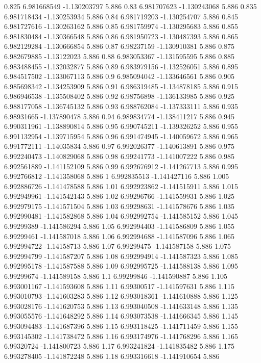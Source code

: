 {0.825 6.981668549 -1.130203797 5.886
0.83 6.981707623 -1.130243068 5.886
0.835 6.981718434 -1.130253934 5.886
0.84 6.981719203 -1.130254707 5.886
0.845 6.981727616 -1.130263162 5.886
0.85 6.981759974 -1.130295683 5.886
0.855 6.981830484 -1.130366548 5.886
0.86 6.981950723 -1.130487393 5.886
0.865 6.982129284 -1.130666854 5.886
0.87 6.98237159 -1.130910381 5.886
0.875 6.982679885 -1.13122023 5.886
0.88 6.983053367 -1.131595595 5.886
0.885 6.983488455 -1.132032877 5.886
0.89 6.983979156 -1.132526051 5.886
0.895 6.984517502 -1.133067113 5.886
0.9 6.985094042 -1.133646561 5.886
0.905 6.985698342 -1.134253909 5.886
0.91 6.986319485 -1.134878185 5.886
0.915 6.986946538 -1.135508402 5.886
0.92 6.98756898 -1.136133985 5.886
0.925 6.988177058 -1.136745132 5.886
0.93 6.988762084 -1.137333111 5.886
0.935 6.98931665 -1.137890478 5.886
0.94 6.989834774 -1.138411217 5.886
0.945 6.990311961 -1.138890814 5.886
0.95 6.990745211 -1.139326252 5.886
0.955 6.991132954 -1.139715954 5.886
0.96 6.991474945 -1.140059672 5.886
0.965 6.991772111 -1.14035834 5.886
0.97 6.992026377 -1.140613891 5.886
0.975 6.992240473 -1.140829068 5.886
0.98 6.99241773 -1.141007222 5.886
0.985 6.992561889 -1.141152109 5.886
0.99 6.992676912 -1.141267713 5.886
0.995 6.992766812 -1.141358068 5.886
1 6.992835513 -1.141427116 5.886
1.005 6.992886726 -1.141478588 5.886
1.01 6.992923862 -1.141515911 5.886
1.015 6.992949961 -1.141542143 5.886
1.02 6.99296766 -1.141559931 5.886
1.025 6.992979175 -1.141571504 5.886
1.03 6.99298631 -1.141578676 5.886
1.035 6.992990481 -1.141582868 5.886
1.04 6.992992754 -1.141585152 5.886
1.045 6.99299389 -1.141586294 5.886
1.05 6.992994403 -1.141586809 5.886
1.055 6.99299461 -1.141587018 5.886
1.06 6.992994688 -1.141587096 5.886
1.065 6.992994722 -1.14158713 5.886
1.07 6.99299475 -1.141587158 5.886
1.075 6.992994799 -1.141587207 5.886
1.08 6.992994914 -1.141587323 5.886
1.085 6.992995178 -1.141587588 5.886
1.09 6.992995725 -1.141588138 5.886
1.095 6.99299674 -1.141589158 5.886
1.1 6.99299846 -1.141590887 5.886
1.105 6.993001167 -1.141593608 5.886
1.11 6.99300517 -1.141597631 5.886
1.115 6.993010793 -1.141603283 5.886
1.12 6.993018361 -1.141610888 5.886
1.125 6.993028176 -1.141620753 5.886
1.13 6.993040508 -1.141633148 5.886
1.135 6.993055576 -1.141648292 5.886
1.14 6.993073538 -1.141666345 5.886
1.145 6.993094483 -1.141687396 5.886
1.15 6.993118425 -1.141711459 5.886
1.155 6.993145302 -1.141738472 5.886
1.16 6.993174976 -1.141768296 5.886
1.165 6.99320724 -1.141800723 5.886
1.17 6.993241824 -1.141835482 5.886
1.175 6.993278405 -1.141872248 5.886
1.18 6.993316618 -1.141910654 5.886
}
